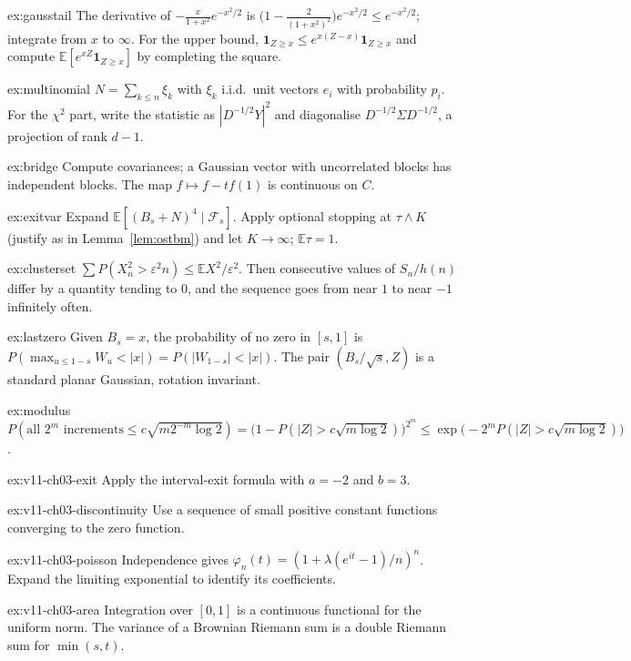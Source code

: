 \begin{hint}{ex:gausstail}
The derivative of $-\frac x{1+x^2}e^{-x^2/2}$ is $\bigl(1-\frac2{(1+x^2)^2}\bigr)e^{-x^2/2}\le e^{-x^2/2}$; integrate from $x$ to $\infty$. For the upper bound, $\mathbf 1_{Z\ge x}\le e^{x(Z-x)}\mathbf 1_{Z\ge x}$
and compute $\mathbb E[e^{xZ}\mathbf 1_{Z\ge x}]$ by completing the square.
\end{hint}
\begin{hint}{ex:multinomial}
$N=\sum_{k\le n}\xi_k$ with $\xi_k$ i.i.d.\ unit vectors $e_i$ with probability $p_i$. For the $\chi^2$ part, write the statistic as $|D^{-1/2}Y|^2$ and diagonalise
$D^{-1/2}\Sigma D^{-1/2}$, a projection of rank $d-1$.
\end{hint}
\begin{hint}{ex:bridge}
Compute covariances; a Gaussian vector with uncorrelated blocks has independent blocks. The map $f\mapsto f-tf(1)$ is continuous on $C$.
\end{hint}
\begin{hint}{ex:exitvar}
Expand $\mathbb E[(B_s+N)^4\mid\mathcal F_s]$. Apply optional stopping at $\tau\wedge K$ (justify as in Lemma~\ref{lem:ostbm}) and let $K\to\infty$; $\mathbb E\tau=1$.
\end{hint}
\begin{hint}{ex:clusterset}
$\sum P(X_n^2>\varepsilon^2n)\le\mathbb E X^2/\varepsilon^2$. Then consecutive values of $S_n/h(n)$ differ by a quantity tending to $0$, and the sequence goes from near $1$ to near $-1$
infinitely often.
\end{hint}
\begin{hint}{ex:lastzero}
Given $B_s=x$, the probability of no zero in $[s,1]$ is $P(\max_{u\le1-s}W_u<|x|)=P(|W_{1-s}|<|x|)$. The pair $(B_s/\sqrt s,Z)$ is a standard planar Gaussian, rotation invariant.
\end{hint}
\begin{hint}{ex:modulus}
$P(\text{all }2^m\text{ increments}\le c\sqrt{m2^{-m}\log2})=\bigl(1-P(|Z|>c\sqrt{m\log2})\bigr)^{2^m}\le\exp\bigl(-2^mP(|Z|>c\sqrt{m\log2})\bigr)$.
\end{hint}

\begin{hint}{ex:v11-ch03-exit}
Apply the interval-exit formula with $a=-2$ and $b=3$.
\end{hint}
\begin{hint}{ex:v11-ch03-discontinuity}
Use a sequence of small positive constant functions converging to the zero function.
\end{hint}
\begin{hint}{ex:v11-ch03-poisson}
Independence gives $\varphi_n(t)=(1+\lambda(e^{it}-1)/n)^n$. Expand the limiting exponential to identify its coefficients.
\end{hint}
\begin{hint}{ex:v11-ch03-area}
Integration over $[0,1]$ is a continuous functional for the uniform norm. The variance of a Brownian Riemann sum is a double Riemann sum for $\min(s,t)$.
\end{hint}


